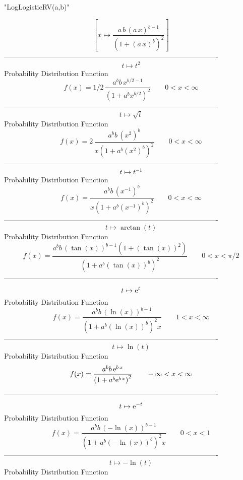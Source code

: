 \documentclass[12pt]{article}
\begin{document}
 
                            "LogLogisticRV(a,b)"

$$[x\mapsto {\frac {a\,b\, \left( a\,x \right) ^{b-1}}{ \left( 1+
 \left( a\,x \right) ^{b} \right) ^{2}}}]
$$-------------------------------------------------------------------------------------------  \\$$t\mapsto {t}^{2}
$$Probability Distribution Function 
$$  f(x)=1/2\,{\frac {{a}^{b}b\,{x}^{b/2-1}}{ \left( 1+{a}^{b}{x}^{b/2}
 \right) ^{2}}}
 \qquad0
 < x < \infty 
$$-------------------------------------------------------------------------------------------  \\$$t\mapsto \sqrt {t}
$$Probability Distribution Function 
$$  f(x)=2\,{\frac {{a}^{b}b\, \left( {x}^{2} \right) ^{b}}{x \left( 1+{a}^{b}
 \left( {x}^{2} \right) ^{b} \right) ^{2}}}
 \qquad0
 < x < \infty 
$$-------------------------------------------------------------------------------------------  \\$$t\mapsto {t}^{-1}
$$Probability Distribution Function 
$$  f(x)={\frac {{a}^{b}b\, \left( {x}^{-1} \right) ^{b}}{x \left( 1+{a}^{b}
 \left( {x}^{-1} \right) ^{b} \right) ^{2}}}
 \qquad0
 < x < \infty 
$$-------------------------------------------------------------------------------------------  \\$$t\mapsto \arctan \left( t \right) 
$$Probability Distribution Function 
$$  f(x)={\frac {{a}^{b}b\, \left( \tan \left( x \right)  \right) ^{b-1}
 \left( 1+ \left( \tan \left( x \right)  \right) ^{2} \right) }{
 \left( 1+{a}^{b} \left( \tan \left( x \right)  \right) ^{b} \right) ^
{2}}}
 \qquad0
 < x < \pi/2
$$-------------------------------------------------------------------------------------------  \\$$t\mapsto {{\rm e}^{t}}
$$Probability Distribution Function 
$$  f(x)={\frac {{a}^{b}b\, \left( \ln  \left( x \right)  \right) ^{b-1}}{
 \left( 1+{a}^{b} \left( \ln  \left( x \right)  \right) ^{b} \right) ^
{2}x}}
 \qquad1
 < x < \infty 
$$-------------------------------------------------------------------------------------------  \\$$t\mapsto \ln  \left( t \right) 
$$Probability Distribution Function 
$$  f(x)={\frac {{a}^{b}b\,{{\rm e}^{b\,x}}}{ \left( 1+{a}^{b}{{\rm e}^{b\,x}}
 \right) ^{2}}}
 \qquad-\infty 
 < x < \infty 
$$-------------------------------------------------------------------------------------------  \\$$t\mapsto {{\rm e}^{-t}}
$$Probability Distribution Function 
$$  f(x)={\frac {{a}^{b}b\, \left( -\ln  \left( x \right)  \right) ^{b-1}}{
 \left( 1+{a}^{b} \left( -\ln  \left( x \right)  \right) ^{b} \right) 
^{2}x}}
 \qquad0
 < x < 1
$$-------------------------------------------------------------------------------------------  \\$$t\mapsto -\ln  \left( t \right) 
$$Probability Distribution Function 
\end{document}
